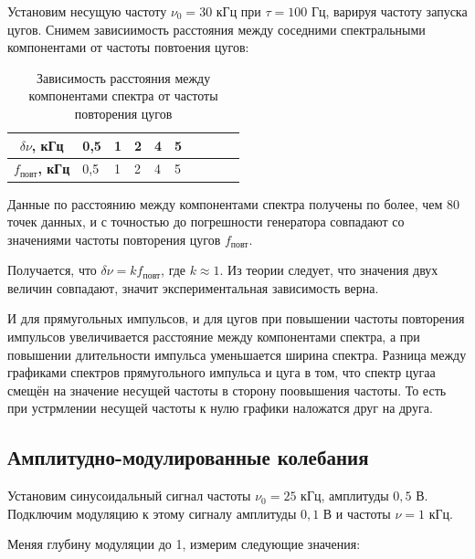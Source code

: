 \documentclass[a4paper, 12pt]{article}%
\begin{document}
Установим несущую частоту $\nu_0 = 30$ кГц при $\tau = 100$ Гц, варируя частоту запуска цугов. Снимем зависиимость расстояния между соседними спектральными компонентами от частоты повтоения цугов:

\begin{table}[]
    \centering
    \begin{tabular}{|c|l|l|l|l|l|l|l|l|l|}
        \hline
        \textbf{$\delta \nu$, кГц}      & 0,5 & 1  & 2 & 4  & 5  \\ \hline
        \textbf{$f_{\text{повт}}$, кГц} & 0,5 & 1  & 2 & 4  & 5  \\ \hline
    \end{tabular}
    \caption{Зависимость расстояния между компонентами спектра от частоты повторения цугов}
\end{table}

Данные по расстоянию между компонентами спектра получены по более, чем 80 точек данных, и с точностью до погрешности генератора совпадают со значениями частоты повторения цугов $f_{\text{повт}}$.

Получается, что $\delta \nu = k f_{\text{повт}}$, где $k \approx 1$. Из теории следует, что значения двух величин совпадают, значит экспериментальная зависимость верна.

И для прямугольных импульсов, и для цугов при повышении частоты повторения импульсов увеличивается расстояние между компонентами спектра, а при повышении длительности импульса уменьшается ширина спектра. Разница между графиками спектров прямугольного импульса и цуга в том, что спектр цугаа смещён на значение несущей частоты в сторону поовышения частоты. То есть при устрмлении несущей частоты к нулю графики наложатся друг на друга.

\subsection{Амплитудно-модулированные колебания}

Установим синусоидальный сигнал частоты $\nu_0 = 25$ кГц, амплитуды $0,5$ В. Подключим модуляцию к этому сигналу амплитуды $0,1$ В и частоты $\nu = 1$ кГц.

Меняя глубину модуляции до 1, измерим следующие значения:
\end{document}

